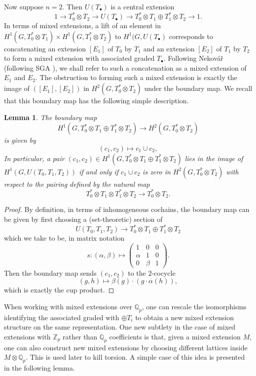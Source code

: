 \documentclass[11pt]{amsart}
\def\Z{\mathbb Z}
\def\Q{\mathbb Q}
\theoremstyle{plain}
\newtheorem{lemma}{Lemma}
\theoremstyle{definition}
\begin{document}
Now suppose $n=2$. Then $U(T_\bullet )$ is a central extension
\[
1\to T_0 ^* \otimes T_2 \to U(T_\bullet )\to T_0 ^* \otimes T_1 \oplus T_1 ^* \otimes T_2 \to 1.
\]
In terms of mixed extensions, a lift of an element in $H^1 (G,T_0 ^* \otimes T_1 )\times H^1 (G,T_1 ^* \otimes T_2 )$ to $H^1 (G,U(T_{\bullet })$ corresponds to concatenating an extension $[E_1 ]$ of $T_0 $ by $T_1$ and an extension $[E_2 ]$ of $T_1 $ by $T_2 $ to form a mixed extension with associated graded $T_\bullet $. Following Nekov\'{a}\v{r} \cite{nekovar} (following SGA \cite{SGA7}), we shall refer to such a concatenation as a mixed extension of $E_1 $ and $E_2$. The obstruction to forming such a mixed extension is exactly the image of $([E_1 ],[E_2 ])$ in $H^2 (G,T_0 ^* \otimes T_2 )$ under the boundary map. We recall that this boundary map has the following simple description.
\begin{lemma}
The boundary map
\[
H^1 (G,T_0 ^* \otimes T_1 \oplus T_1 ^* \otimes T_2 )\to H^2 (G,T_0 ^* \otimes T_2 )
\]
is given by 
\[
(c_1 ,c_2 )\mapsto c_1 \cup c_2 ,
\]
In particular, a pair $(c_1 ,c_2 )\in H^1 (G,T_0 ^* \otimes T_1 \oplus T_1 ^* \otimes T_2 )$ lies in the image of $H^1 (G,U(T_0 ,T_1 ,T_2 ))$ if and only if $c_1 \cup c_2 $ is zero in $H^2 (G,T_0 ^* \otimes T_2 )$ with respect to the pairing defined by the natural map
\[
T_0 ^* \otimes T_1 \otimes T_1 ^* \otimes T_2 \to T_0 ^* \otimes T_2 .
\]
\end{lemma}
\begin{proof}
By definition, in terms of inhomogeneous cochains, the boundary map can be given by first choosing a (set-theoretic) section of 
\[
U(T_0 ,T_1 ,T_2 )\to T_0 ^* \otimes T_1 \oplus T_1 ^* \otimes T_2 
\]
which we take to be, in matrix notation
\[
s:(\alpha ,\beta )\mapsto \left( \begin{array}{ccc}1 & 0 & 0 \\ \alpha & 1 & 0 \\ 0 & \beta & 1 \end{array} \right).
\]
Then the boundary map sends $(c_1 ,c_2 )$ to the $2$-cocycle
\[
(g,h)\mapsto \beta (g)\cdot (g\cdot \alpha (h)),
\]
which is exactly the cup product.
\end{proof}
When working with mixed extensions over $\Q _p $, one can rescale the isomorphisms identifying the associated graded with $\oplus T_i$ to obtain a new mixed extension structure on the same representation. One new subtlety in the case of mixed extensions with $\Z _p$ rather than $\Q _p$ coefficients is that, given a mixed extension $M$, one can also construct new mixed extensions by choosing different lattices inside $M\otimes \Q _p $. This is used later to kill torsion. A simple case of this idea is presented in the following lemma.
\end{document}
